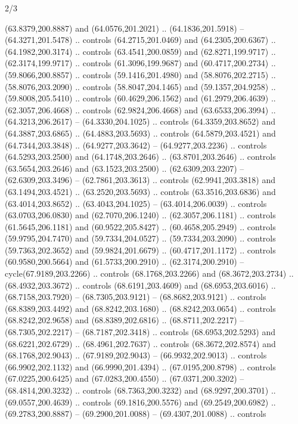 \begin{flagdescription}{2/3}
\begin{scope}[yshift=\flagwidth,scale=\flagwidth/1241.93737]
\begin{scope}[y=-1mm, x=1mm,draw=gold,fill=blue,line join=miter,miter limit=4,line width=1.8\lw]
\begin{scope}[shift={(78,80)}]
  (63.8379,200.8887) and (64.0576,201.2021) .. (64.1836,201.5918) --
  (64.3271,201.5478) .. controls (64.2715,201.0469) and (64.2305,200.6367) ..
  (64.1982,200.3174) .. controls (63.4541,200.0859) and (62.8271,199.9717) ..
  (62.3174,199.9717) .. controls (61.3096,199.9687) and (60.4717,200.2734) ..
  (59.8066,200.8857) .. controls (59.1416,201.4980) and (58.8076,202.2715) ..
  (58.8076,203.2090) .. controls (58.8047,204.1465) and (59.1357,204.9258) ..
  (59.8008,205.5410) .. controls (60.4629,206.1562) and (61.2979,206.4639) ..
  (62.3057,206.4668) .. controls (62.9824,206.4668) and (63.6533,206.3994) ..
  (64.3213,206.2617) -- (64.3330,204.1025) .. controls (64.3359,203.8652) and
  (64.3887,203.6865) .. (64.4883,203.5693) .. controls (64.5879,203.4521) and
  (64.7344,203.3848) .. (64.9277,203.3642) -- (64.9277,203.2236) .. controls
  (64.5293,203.2500) and (64.1748,203.2646) .. (63.8701,203.2646) .. controls
  (63.5654,203.2646) and (63.1523,203.2500) .. (62.6309,203.2207) --
  (62.6309,203.3496) -- (62.7861,203.3613) .. controls (62.9941,203.3818) and
  (63.1494,203.4521) .. (63.2520,203.5693) .. controls (63.3516,203.6836) and
  (63.4014,203.8652) .. (63.4043,204.1025) -- (63.4014,206.0039) .. controls
  (63.0703,206.0830) and (62.7070,206.1240) .. (62.3057,206.1181) .. controls
  (61.5645,206.1181) and (60.9522,205.8427) .. (60.4658,205.2949) .. controls
  (59.9795,204.7470) and (59.7334,204.0527) .. (59.7334,203.2090) .. controls
  (59.7363,202.3652) and (59.9824,201.6679) .. (60.4717,201.1172) .. controls
  (60.9580,200.5664) and (61.5733,200.2910) .. (62.3174,200.2910) --
  cycle(67.9189,203.2266) .. controls (68.1768,203.2266) and (68.3672,203.2734)
  .. (68.4932,203.3672) .. controls (68.6191,203.4609) and (68.6953,203.6016) ..
  (68.7158,203.7920) -- (68.7305,203.9121) -- (68.8682,203.9121) .. controls
  (68.8389,203.4492) and (68.8242,203.1680) .. (68.8242,203.0654) .. controls
  (68.8242,202.9658) and (68.8389,202.6816) .. (68.8711,202.2217) --
  (68.7305,202.2217) -- (68.7187,202.3418) .. controls (68.6953,202.5293) and
  (68.6221,202.6729) .. (68.4961,202.7637) .. controls (68.3672,202.8574) and
  (68.1768,202.9043) .. (67.9189,202.9043) -- (66.9932,202.9013) .. controls
  (66.9902,202.1132) and (66.9990,201.4394) .. (67.0195,200.8798) .. controls
  (67.0225,200.6425) and (67.0283,200.4550) .. (67.0371,200.3202) --
  (68.4814,200.3232) .. controls (68.7363,200.3232) and (68.9297,200.3701) ..
  (69.0557,200.4639) .. controls (69.1816,200.5576) and (69.2549,200.6982) ..
  (69.2783,200.8887) -- (69.2900,201.0088) -- (69.4307,201.0088) .. controls

\end{scope}
\end{scope}
\end{scope}
\end{flagdescription}
